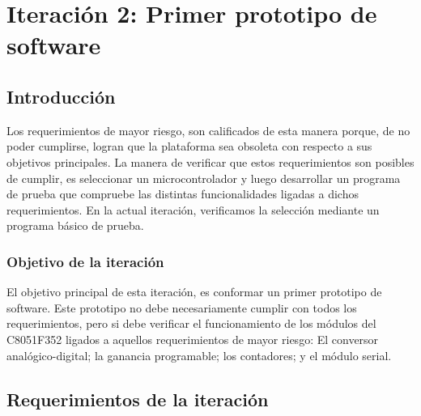 \chapter{Iteración 2: Primer prototipo de software} %
\label{cha:iteracion_2}

\section{Introducción} %
\label{it2:sec:introduccion}


Los requerimientos de mayor riesgo, son calificados de esta manera porque, de no poder cumplirse, logran que la plataforma sea obsoleta con respecto a sus objetivos principales. La manera de verificar que estos requerimientos son posibles de cumplir, es seleccionar un microcontrolador y luego desarrollar un programa de prueba que compruebe las distintas funcionalidades ligadas a dichos requerimientos. En la actual iteración, verificamos la selección mediante un programa básico de prueba.

\subsection{Objetivo de la iteración} %
\label{sub:objetivo_de_la_iteracion}

El objetivo principal de esta iteración, es conformar un primer prototipo de software. Este prototipo no debe necesariamente cumplir con todos los requerimientos, pero si debe verificar el funcionamiento de los módulos del C8051F352 ligados a aquellos requerimientos de mayor riesgo: El conversor analógico-digital; la ganancia programable; los contadores; y el módulo serial.




\section{Requerimientos de la iteración} %
\label{it2:sec:requerimientos_de_la_iteracion}


